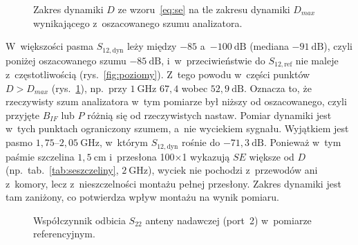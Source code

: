 \documentclass[11pt,a4paper]{article}
\begin{document}
\begin{figure}[H]
  \centering
  \caption{Zakres dynamiki $D$ ze wzoru~\eqref{eq:se} na tle zakresu dynamiki $D_{max}$
           wynikającego z~oszacowanego szumu analizatora.}
  \label{fig:dynamika}
\end{figure}

W~większości pasma $S_{12,\mathrm{dyn}}$ leży między $-85$ a~$-100\ \mathrm{dB}$ (mediana
$-91\ \mathrm{dB}$), czyli poniżej oszacowanego szumu $-85\ \mathrm{dB}$, i~w~przeciwieństwie
do $S_{12,\mathrm{ref}}$ nie maleje z~częstotliwością (rys.~\ref{fig:poziomy}). Z~tego powodu
w~części punktów $D > D_{max}$ (rys.~\ref{fig:dynamika}), np.\ przy $1\ \mathrm{GHz}$ $67{,}4$
wobec $52{,}9\ \mathrm{dB}$.
Oznacza to, że rzeczywisty szum analizatora w~tym pomiarze był niższy od
oszacowanego, czyli przyjęte $B_{IF}$ lub $P$ różnią się od rzeczywistych nastaw. Pomiar
dynamiki jest w~tych punktach ograniczony szumem, a~nie wyciekiem sygnału. Wyjątkiem jest pasmo
$1{,}75$--$2{,}05\ \mathrm{GHz}$, w~którym $S_{12,\mathrm{dyn}}$ rośnie do $-71{,}3\ \mathrm{dB}$.
Ponieważ w~tym paśmie szczelina $1{,}5\ \mathrm{cm}$ i~przesłona 100$\times$1 wykazują $SE$
większe od $D$ (np.\ tab.~\ref{tab:seszczeliny}, $2\ \mathrm{GHz}$), wyciek nie pochodzi
z~przewodów ani z~komory, lecz z~nieszczelności montażu pełnej przesłony. Zakres dynamiki jest tam zaniżony, co
potwierdza wpływ montażu na wynik pomiaru.

\begin{figure}[htbp]
  \centering
  \caption{Współczynnik odbicia $S_{22}$ anteny nadawczej (port~2) w~pomiarze referencyjnym.}
  \label{fig:s22}
\end{figure}
\end{document}
